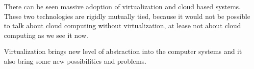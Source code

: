 %
%
%
%

There can be seen massive adoption of virtualization and cloud based systems. These two technologies are rigidly mutually tied, because it would not be possible to talk about cloud computing without virtualization, at lease not about cloud computing as we see it now.

Virtualization brings new level of abstraction into the computer systems and it also bring some new possibilities and problems. 

